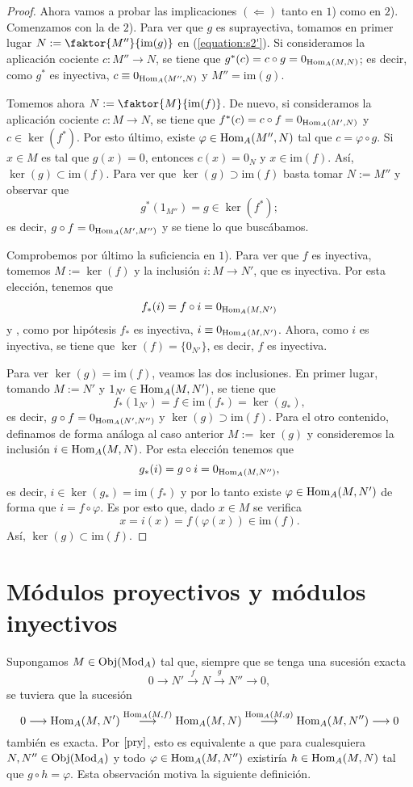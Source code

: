 \documentclass[../main.tex]{subfiles}
\begin{document}
\begin{proof}
Ahora vamos a probar las implicaciones $(\Leftarrow)$ tanto en $1$) como en $2$). Comenzamos con la de $2$). Para ver que $g$ es suprayectiva, tomamos en primer lugar $N:=\faktor{M''}{\text{im}(g)}$ en (\ref{equation:s2'}). Si consideramos la aplicación cociente $c:M''\longrightarrow N$, se tiene que $g^*(c)=c\circ g=0_{\operatorname{Hom}_A(M,N)}$; es decir, como $g^*$ es inyectiva, $c\equiv 0_{\operatorname{Hom}_A(M'',N)}$ y $M''=\text{im}(g)$.

Tomemos ahora $N:=\faktor{M}{\text{im}(f)}$. De nuevo, si consideramos la aplicación cociente $c:M\longrightarrow N$, se tiene que $f^*(c)=c\circ f=0_{\operatorname{Hom}_A(M',N)}$ y $c\in\ker(f^*)$. Por esto último, existe $\varphi\in\operatorname{Hom}_A(M'',N)$ tal que $c=\varphi\circ g$. Si $x\in M$ es tal que $g(x)=0$, entonces $c(x)=0_N$ y $x\in\text{im}(f)$. Así, $\ker(g)\subset\text{im}(f)$. Para ver que $\ker(g)\supset\text{im}(f)$ basta tomar $N:=M''$ y observar que $$g^*(1_{M''})=g\in\ker(f^*);$$ es decir, $g\circ f=0_{\operatorname{Hom}_A(M',M'')}$ y se tiene lo que buscábamos.

Comprobemos por último la suficiencia en $1$). Para ver que $f$ es inyectiva, tomemos $M:=\ker(f)$ y la inclusión $i:M\longrightarrow N'$, que es inyectiva. Por esta elección, tenemos que
$$f_*(i)=f\circ i=0_{\operatorname{Hom}_A(M,N')}$$
y , como por hipótesis $f_*$ es inyectiva, $i\equiv 0_{\operatorname{Hom}_A(M,N')}$. Ahora, como $i$ es inyectiva, se tiene que $\ker(f)=\{0_{N'}\}$, es decir, $f$ es inyectiva.

Para ver $\ker(g)=\text{im}(f)$, veamos las dos inclusiones. En primer lugar, tomando $M:=N'$ y $1_{N'}\in\operatorname{Hom}_A(M,N')$, se tiene que
$$f_*(1_{N'})=f\in\text{im}(f_*)=\ker(g_*),$$
es decir, $g\circ f=0_{\operatorname{Hom}_A(N',N'')}$ y $\ker(g)\supset\text{im}(f)$. Para el otro contenido, definamos de forma análoga al caso anterior $M:=\ker(g)$ y consideremos la inclusión $i\in\operatorname{Hom}_A(M,N)$. Por esta elección tenemos que
$$g_*(i)=g\circ i=0_{\operatorname{Hom}_A(M,N'')},$$
es decir, $i\in\ker(g_*)=\text{im}(f_*)$ y por lo tanto existe $\varphi\in\operatorname{Hom}_A(M,N')$ de forma que $i=f\circ\varphi$. Es por esto que, dado $x\in M$ se verifica
$$x=i(x)=f(\varphi(x))\in\text{im}(f).$$
Así, $\ker(g)\subset\text{im}(f)$.
\end{proof}

\section{Módulos proyectivos y módulos inyectivos}
Supongamos $M\in\operatorname{Obj}(\operatorname{Mod}_A)$ tal que, siempre que se tenga una sucesión exacta
$$0\longrightarrow N'\overset{f}{\longrightarrow}N\overset{g}{\longrightarrow}N''\longrightarrow 0,$$
se tuviera que la sucesión
$$0\longrightarrow \operatorname{Hom}_A(M,N')\overset{\operatorname{Hom}_A(M,f)}{\longrightarrow}\operatorname{Hom}_A(M,N)\overset{\operatorname{Hom}_A(M,g)}{\longrightarrow}\operatorname{Hom}_A(M,N'')\longrightarrow0$$
también es exacta. Por $\ref{pry}$, esto es equivalente a que para cualesquiera $N,N''\in\operatorname{Obj}(\operatorname{Mod}_A)$ y todo $\varphi\in\operatorname{Hom}_A(M,N'')$ existiría $h\in\operatorname{Hom}_A(M,N)$ tal que $g\circ h=\varphi$. Esta observación motiva la siguiente definición.
\end{document}
